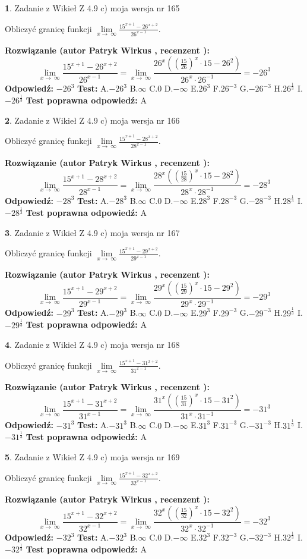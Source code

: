 \documentclass[12pt, a4paper]{article}
\theoremstyle{definition} %
\newtheorem{zad}{}
\newcommand{\zadStart}[1]{\begin{zad}#1\newline}
\newcommand{\zadStop}{\end{zad}}
\newcommand{\rozwStart}[2]{\noindent \textbf{Rozwiązanie (autor #1 , recenzent #2): }\newline}
\newcommand{\rozwStop}{\newline}
\newcommand{\odpStart}{\noindent \textbf{Odpowiedź:}\newline}
\newcommand{\odpStop}{\newline}
\newcommand{\testStart}{\noindent \textbf{Test:}\newline}
\newcommand{\testStop}{\newline}
\newcommand{\kluczStart}{\noindent \textbf{Test poprawna odpowiedź:}\newline}
\newcommand{\kluczStop}{\newline}
\begin{document}
\zadStart{Zadanie z Wikieł Z 4.9 c) moja wersja nr 165}


Obliczyć granicę funkcji  $\lim\limits_{x\to\ \infty}\frac{15^{x+1}-26^{x+2}}{26^{x-1}}$.
\zadStop
\rozwStart{Patryk Wirkus}{}
$$\lim\limits_{x\to\ \infty}\frac{15^{x+1}-26^{x+2}}{26^{x-1}}=\lim\limits_{x\to\ \infty}\frac{26^{x}((\frac{15}{26})^{x}\cdot 15 -26^{2})}{26^{x}\cdot 26^{-1}} = -26^{3}$$
\rozwStop
\odpStart
$-26^{3}$
\odpStop
\testStart
A.$-26^{3}$ B.$\infty$ C.$0$ D.$-\infty$ E.$26^{3}$
F.$26^{-3}$ G.$-26^{-3}$
H.$26^{\frac{1}{3}}$
I.$-26^{\frac{1}{3}}$
\testStop
\kluczStart
A
\kluczStop



\zadStart{Zadanie z Wikieł Z 4.9 c) moja wersja nr 166}


Obliczyć granicę funkcji  $\lim\limits_{x\to\ \infty}\frac{15^{x+1}-28^{x+2}}{28^{x-1}}$.
\zadStop
\rozwStart{Patryk Wirkus}{}
$$\lim\limits_{x\to\ \infty}\frac{15^{x+1}-28^{x+2}}{28^{x-1}}=\lim\limits_{x\to\ \infty}\frac{28^{x}((\frac{15}{28})^{x}\cdot 15 -28^{2})}{28^{x}\cdot 28^{-1}} = -28^{3}$$
\rozwStop
\odpStart
$-28^{3}$
\odpStop
\testStart
A.$-28^{3}$ B.$\infty$ C.$0$ D.$-\infty$ E.$28^{3}$
F.$28^{-3}$ G.$-28^{-3}$
H.$28^{\frac{1}{3}}$
I.$-28^{\frac{1}{3}}$
\testStop
\kluczStart
A
\kluczStop



\zadStart{Zadanie z Wikieł Z 4.9 c) moja wersja nr 167}


Obliczyć granicę funkcji  $\lim\limits_{x\to\ \infty}\frac{15^{x+1}-29^{x+2}}{29^{x-1}}$.
\zadStop
\rozwStart{Patryk Wirkus}{}
$$\lim\limits_{x\to\ \infty}\frac{15^{x+1}-29^{x+2}}{29^{x-1}}=\lim\limits_{x\to\ \infty}\frac{29^{x}((\frac{15}{29})^{x}\cdot 15 -29^{2})}{29^{x}\cdot 29^{-1}} = -29^{3}$$
\rozwStop
\odpStart
$-29^{3}$
\odpStop
\testStart
A.$-29^{3}$ B.$\infty$ C.$0$ D.$-\infty$ E.$29^{3}$
F.$29^{-3}$ G.$-29^{-3}$
H.$29^{\frac{1}{3}}$
I.$-29^{\frac{1}{3}}$
\testStop
\kluczStart
A
\kluczStop



\zadStart{Zadanie z Wikieł Z 4.9 c) moja wersja nr 168}


Obliczyć granicę funkcji  $\lim\limits_{x\to\ \infty}\frac{15^{x+1}-31^{x+2}}{31^{x-1}}$.
\zadStop
\rozwStart{Patryk Wirkus}{}
$$\lim\limits_{x\to\ \infty}\frac{15^{x+1}-31^{x+2}}{31^{x-1}}=\lim\limits_{x\to\ \infty}\frac{31^{x}((\frac{15}{31})^{x}\cdot 15 -31^{2})}{31^{x}\cdot 31^{-1}} = -31^{3}$$
\rozwStop
\odpStart
$-31^{3}$
\odpStop
\testStart
A.$-31^{3}$ B.$\infty$ C.$0$ D.$-\infty$ E.$31^{3}$
F.$31^{-3}$ G.$-31^{-3}$
H.$31^{\frac{1}{3}}$
I.$-31^{\frac{1}{3}}$
\testStop
\kluczStart
A
\kluczStop



\zadStart{Zadanie z Wikieł Z 4.9 c) moja wersja nr 169}


Obliczyć granicę funkcji  $\lim\limits_{x\to\ \infty}\frac{15^{x+1}-32^{x+2}}{32^{x-1}}$.
\zadStop
\rozwStart{Patryk Wirkus}{}
$$\lim\limits_{x\to\ \infty}\frac{15^{x+1}-32^{x+2}}{32^{x-1}}=\lim\limits_{x\to\ \infty}\frac{32^{x}((\frac{15}{32})^{x}\cdot 15 -32^{2})}{32^{x}\cdot 32^{-1}} = -32^{3}$$
\rozwStop
\odpStart
$-32^{3}$
\odpStop
\testStart
A.$-32^{3}$ B.$\infty$ C.$0$ D.$-\infty$ E.$32^{3}$
F.$32^{-3}$ G.$-32^{-3}$
H.$32^{\frac{1}{3}}$
I.$-32^{\frac{1}{3}}$
\testStop
\kluczStart
A
\kluczStop
\end{document}
